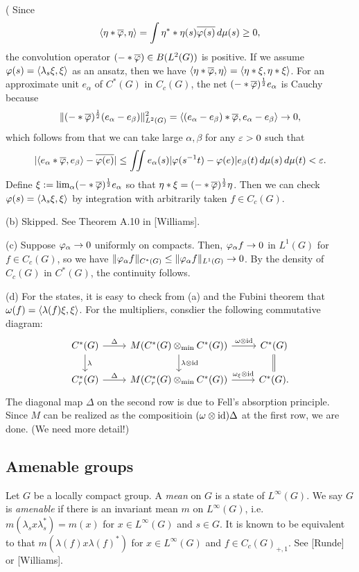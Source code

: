 \documentclass{../../../small}
\begin{document}
\begin{pf}
(
Since
\[\langle\eta*\overline{\varphi},\eta\rangle=\int\eta^**\eta(s)\overline{\varphi(s)}\,d\mu(s)\ge0,\]
the convolution operator $(-*\overline{\varphi})\in B(L^2(G))$ is positive.
If we assume $\varphi(s)=\langle\lambda_s\xi,\xi\rangle$ as an ansatz, then we have $\langle\eta*\overline{\varphi},\eta\rangle=\langle\eta*\xi,\eta*\xi\rangle$.
For an approximate unit $e_\alpha$ of $C^*(G)$ in $C_c(G)$, the net $(-*\overline{\varphi})^{\frac12}e_\alpha$ is Cauchy because
\[\|(-*\overline{\varphi})^{\frac12}(e_\alpha-e_\beta)\|_{L^2(G)}^2=\langle(e_\alpha-e_\beta)*\overline{\varphi},e_\alpha-e_\beta\rangle\to0,\]
which follows from that we can take large $\alpha,\beta$ for any $\varepsilon>0$ such that
\[|\langle e_\alpha*\overline{\varphi},e_\beta\rangle-\overline{\varphi(e)}|\le\iint e_\alpha(s)|\varphi(s^{-1}t)-\varphi(e)|e_\beta(t)\,d\mu(s)\,d\mu(t)<\varepsilon.\]
Define $\xi:=\lim_\alpha(-*\overline{\varphi})^{\frac12}e_\alpha$ so that $\eta*\xi=(-*\overline{\varphi})^{\frac12}\eta$.
Then we can check $\varphi(s)=\langle\lambda_s\xi,\xi\rangle$ by integration with arbitrarily taken $f\in C_c(G)$.

(b)
Skipped.
See Theorem A.10 in [Williams].

(c)
Suppose $\varphi_\alpha\to0$ uniformly on compacts.
Then, $\varphi_\alpha f\to0$ in $L^1(G)$ for $f\in C_c(G)$, so we have $\|\varphi_\alpha f\|_{C^*(G)}\le\|\varphi_\alpha f\|_{L^1(G)}\to0$.
By the density of $C_c(G)$ in $C^*(G)$, the continuity follows.

(d)
For the states, it is easy to check from (a) and the Fubini theorem that $\omega(f)=\langle\lambda(f)\xi,\xi\rangle$.
For the multipliers, consdier the following commutative diagram:
\[\begin{tikzcd}
C^*(G) \ar{r}{\Delta}\ar{d}{\lambda} & M(C^*(G)\otimes_{\min}C^*(G)) \ar{r}{\omega\otimes\id}\ar{d}{\lambda\otimes\id} & C^*(G) \ar[equals]{d}\\
C_r^*(G) \ar{r}{\Delta} & M(C_r^*(G)\otimes_{\min}C^*(G)) \ar{r}{\omega_\xi\otimes\id} & C^*(G).
\end{tikzcd}\]
The diagonal map $\Delta$ on the second row is due to Fell's absorption principle.
Since $M$ can be realized as the compositioin $(\omega\otimes\operatorname{id})\Delta$ at the first row, we are done. (We need more detail!)
\end{pf}



\subsection{Amenable groups}
\begin{defn}
Let $G$ be a locally compact group.
A \emph{mean} on $G$ is a state of $L^\infty(G)$.
We say $G$ is \emph{amenable} if there is an invariant mean $m$ on $L^\infty(G)$, i.e.~$m(\lambda_sx\lambda_s^*)=m(x)$ for $x\in L^\infty(G)$ and $s\in G$.
It is known to be equivalent to that $m(\lambda(f)x\lambda(f)^*)$ for $x\in L^\infty(G)$ and $f\in C_c(G)_{+,1}$.
See [Runde] or [Williams].
\end{defn}
\end{document}
